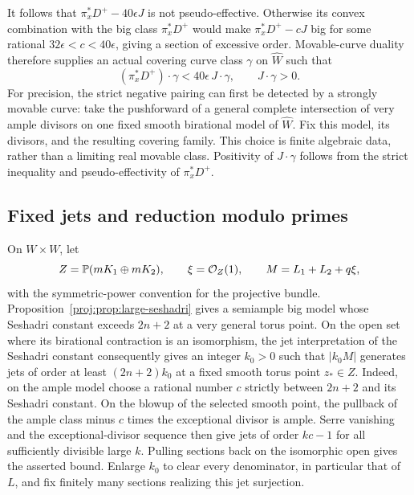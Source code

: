 It follows that \(\pi_x^*D^+-40\epsilon J\) is not pseudo-effective.
Otherwise its convex combination with the big class \(\pi_x^*D^+\)
would make \(\pi_x^*D^+-cJ\) big for some rational
\(32\epsilon<c<40\epsilon\), giving a section of excessive order.
Movable-curve duality \cite[Theorem~2.2]{BDPP} therefore supplies an
actual covering curve class \(\gamma\) on \(\widehat W\) such that
\begin{equation}
\label{proj:fr:curve-test}
 (\pi_x^*D^+)\cdot\gamma
       <40\epsilon\,J\cdot\gamma,\qquad J\cdot\gamma>0.
\end{equation}
For precision, the strict negative pairing can first be detected by a
strongly movable curve: take the pushforward of a general complete
intersection of very ample divisors on one fixed smooth birational
model of \(\widehat W\). Fix this model, its divisors, and the resulting
covering family. This choice is finite algebraic data, rather than a
limiting real movable class. Positivity of \(J\cdot\gamma\) follows
from the strict inequality and pseudo-effectivity of \(\pi_x^*D^+\).

\subsection{Fixed jets and reduction modulo primes}

On \(W\times W\), let
\[
 Z=\mathbb{P}(mK_1\oplus mK_2),\qquad
 \xi=\mathcal{O}_Z(1),\qquad
 M=L_1+L_2+q\xi,
\]
with the symmetric-power convention for the projective bundle.
Proposition~\ref{proj:prop:large-seshadri} gives a semiample big model whose
Seshadri constant exceeds \(2n+2\) at a very general torus point.
On the open set where its birational contraction is an isomorphism,
the jet interpretation of the Seshadri constant consequently gives
an integer \(k_0>0\) such that \(|k_0M|\) generates jets of order
at least \((2n+2)k_0\) at a fixed smooth torus point \(z_*\in Z\).
Indeed, on the ample model choose a rational number \(c\) strictly
between \(2n+2\) and its Seshadri constant. On the blowup of the
selected smooth point, the pullback of the ample class minus \(c\)
times the exceptional divisor is ample. Serre vanishing and the
exceptional-divisor sequence then give jets of order \(kc-1\) for
all sufficiently divisible large \(k\). Pulling sections back on the
isomorphic open gives the asserted bound.
Enlarge \(k_0\) to clear every denominator, in particular that of \(L\),
and fix finitely many sections realizing this jet surjection.

